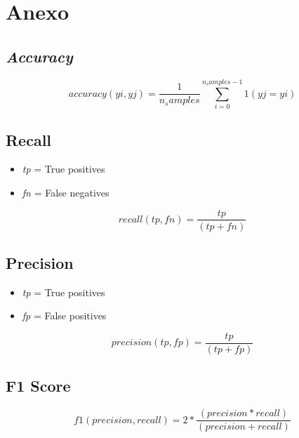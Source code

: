 \section{Anexo}
\subsection{\textit{Accuracy}}
\begin{equation}
    accuracy(yi,yj) =  \frac{1}{n_samples}\sum_{i=0}^{n_samples-1} 1(yj = yi)
    \label{accuracy_equation}
\end{equation}
\subsection{Recall}

\begin{itemize}
    \item \textit{tp} = True positives
    \item \textit{fn} = False negatives
\end{itemize}

\begin{equation}
    recall(tp,fn) =  \frac{tp}{(tp + fn)}
    \label{recall_equation}
\end{equation}

\subsection{Precision}

\begin{itemize}
    \item \textit{tp} = True positives
    \item \textit{fp} = False positives
\end{itemize}

\begin{equation}
    precision(tp,fp) =  \frac{tp}{(tp + fp)}
    \label{precision_equation}
\end{equation}

\subsection{F1 Score}

\begin{equation}
    f1(precision,recall) =  2 * \frac{(precision * recall)}{(precision + recall)}
    \label{f1_equation}
\end{equation}
